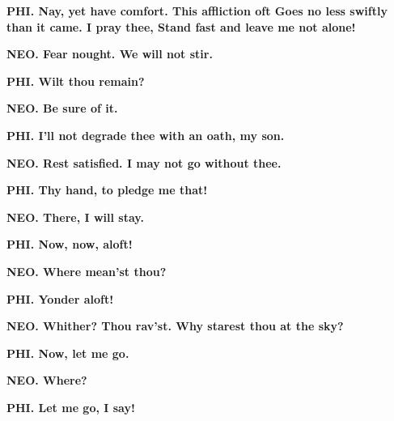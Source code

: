 \documentclass[11pt,letter]{book}
\begin{document}
\par \textbf{PHI. Nay, yet have comfort. This affliction oft Goes no less swiftly than it came. I pray thee, Stand fast and leave me not alone!}
\par 

\par \textbf{NEO. Fear nought. We will not stir.}
\par 

\par \textbf{PHI. Wilt thou remain?}
\par 

\par \textbf{NEO. Be sure of it.}
\par 

\par \textbf{PHI. I’ll not degrade thee with an oath, my son.}
\par 

\par \textbf{NEO. Rest satisfied. I may not go without thee.}
\par 

\par \textbf{PHI. Thy hand, to pledge me that!}
\par 

\par \textbf{NEO. There, I will stay.}
\par 

\par \textbf{PHI. Now, now, aloft!}
\par 

\par \textbf{NEO. Where mean’st thou?}
\par 

\par \textbf{PHI. Yonder aloft!}
\par 

\par \textbf{NEO. Whither? Thou rav’st. Why starest thou at the sky?}
\par 

\par \textbf{PHI. Now, let me go.}
\par 

\par \textbf{NEO. Where?}
\par 

\par \textbf{PHI. Let me go, I say!}
\par 
\end{document}
